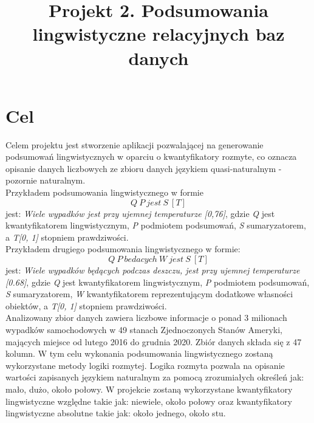 \documentclass{classrep}
\author{
  \studentinfo{Julia Szymańska}{224441} \and
  \studentinfo{Przemysław Zdrzalik}{224466} }
\title{Projekt 2.  Podsumowania lingwistyczne relacyjnych baz danych}
\begin{document}
\maketitle

\section{Cel}
Celem projektu jest stworzenie aplikacji pozwalającej na generowanie podsumowań lingwistycznych\cite{przyklad} w oparciu o kwantyfikatory rozmyte\cite{niewiadomskiRozmyte}, co oznacza opisanie danych liczbowych ze zbioru danych\cite{dane} językiem quasi-naturalnym - pozornie naturalnym. \\Przykładem podsumowania lingwistycznego\cite{przyklad} w formie 
\begin{equation} Q\ P\ jest\ S\ [T] \end{equation}
 jest:  \textit{Wiele wypadków jest przy ujemnej temperaturze [0,76]}, gdzie \textit{Q} jest kwantyfikatorem lingwistycznym, \textit{P} podmiotem podsumowań, \textit{S} sumaryzatorem, a \textit{T[0, 1]} stopniem prawdziwości. \\ \newline Przykładem drugiego podsumowania lingwistycznego w formie:
\begin{equation}  Q \ P \ bedacych\ W\ jest\ S\ [T] \end{equation} 
jest: \textit{Wiele wypadków będących podczas deszczu, jest przy ujemnej temperaturze [0.68]}, gdzie \textit{Q} jest kwantyfikatorem lingwistycznym, \textit{P} podmiotem podsumowań, \textit{S} sumaryzatorem, \textit{W} kwantyfikatorem reprezentującym dodatkowe własności obiektów, a \textit{T[0, 1]} stopniem prawdziwości.  \\ \newline
Analizowany zbior danych zawiera liczbowe informacje o ponad 3 milionach wypadków samochodowych w 49 stanach Zjednoczonych Stanów Ameryki, mających miejsce od lutego 2016 do grudnia 2020\cite{dane}. Zbiór danych składa się z 47 kolumn. W tym celu wykonania podsumowania lingwistycznego zostaną wykorzystane metody logiki rozmytej\cite{fuzzy}. Logika rozmyta pozwala na opisanie wartości zapisanych językiem naturalnym za pomocą zrozumiałych określeń jak: mało, dużo, około połowy. W projekcie zostaną wykorzystane kwantyfikatory lingwistyczne względne takie jak: niewiele, około połowy oraz kwantyfikatory lingwistyczne absolutne takie jak: około jednego, około stu.
\end{document}

